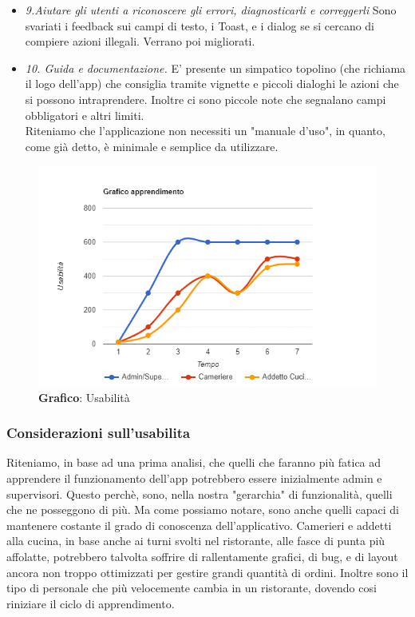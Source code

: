 \begin{flushleft}
\begin{itemize}
            \item \emph{9.Aiutare gli utenti a riconoscere gli errori, diagnosticarli e correggerli} Sono svariati i feedback sui campi di testo, i Toast, e i dialog se si cercano di compiere azioni illegali. Verrano poi migliorati.
            \item  \emph{10. Guida e documentazione.} E' presente un simpatico topolino (che richiama il logo dell'app) che consiglia tramite vignette e piccoli dialoghi le azioni che si possono intraprendere. Inoltre ci sono piccole note che segnalano campi obbligatori e altri limiti.\\
            Riteniamo che l'applicazione non necessiti un "manuale d'uso", in quanto, come già detto, è minimale e semplice da utilizzare.
        \end{itemize}
    \end{flushleft}

    \begin{figure}[H]
        \centering
        \includegraphics[scale=0.6]{assets/immagini varie/grafico usabilita.png}
        \caption{\textbf{Grafico}: Usabilità}\label{fig:Usabilità_graph}
    \end{figure}
    \vspace{0.5cm}
    \subsubsection*{Considerazioni sull'usabilita}
        \begin{flushleft}
            Riteniamo, in base ad una prima analisi, che quelli che faranno più fatica ad apprendere il funzionamento dell'app potrebbero essere inizialmente admin e supervisori.
            Questo perchè, sono, nella nostra "gerarchia" di funzionalità, quelli che ne posseggono di più. 
            Ma come possiamo notare, sono anche quelli capaci di mantenere costante il grado di conoscenza dell'applicativo.
            Camerieri e addetti alla cucina, in base anche ai turni svolti nel ristorante, alle fasce di punta più affolatte, potrebbero talvolta
            soffrire di rallentamente grafici, di bug, e di layout ancora non troppo ottimizzati per gestire grandi quantità di ordini.
            Inoltre sono il tipo di personale che più velocemente cambia in un ristorante, dovendo cosi riniziare il ciclo di apprendimento.
        \end{flushleft}